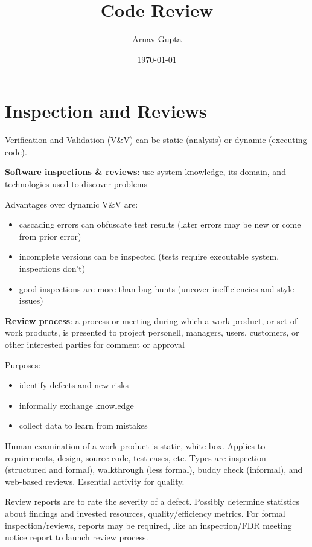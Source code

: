 \documentclass[11pt]{article}
\author{Arnav Gupta}
\date{\today}
\title{Code Review}
\begin{document}
\maketitle
\tableofcontents

\section{Inspection and Reviews}
\label{sec:org54b5808}
Verification and Validation (V\&V) can be static (analysis) or dynamic (executing code).

\textbf{Software inspections \& reviews}: use system knowledge, its domain, and technologies used to discover
problems

Advantages over dynamic V\&V are:
\begin{itemize}
\item cascading errors can obfuscate test results (later errors may be new or come from prior error)
\item incomplete versions can be inspected (tests require executable system, inspections don't)
\item good inspections are more than bug hunts (uncover inefficiencies and style issues)
\end{itemize}

\textbf{Review process}: a process or meeting during which a work product, or set of work products, is
presented to project personell, managers, users, customers, or other interested parties for comment
or approval

Purposes:
\begin{itemize}
\item identify defects and new risks
\item informally exchange knowledge
\item collect data to learn from mistakes
\end{itemize}

Human examination of a work product is static, white-box.
Applies to requirements, design, source code, test cases, etc.
Types are inspection (structured and formal), walkthrough (less formal), buddy check (informal),
and web-based reviews.
Essential activity for quality.

Review reports are to rate the severity of a defect.
Possibly determine statistics about findings and invested resources, quality/efficiency metrics.
For formal inspection/reviews, reports may be required, like an inspection/FDR meeting notice report
to launch review process.
\end{document}
